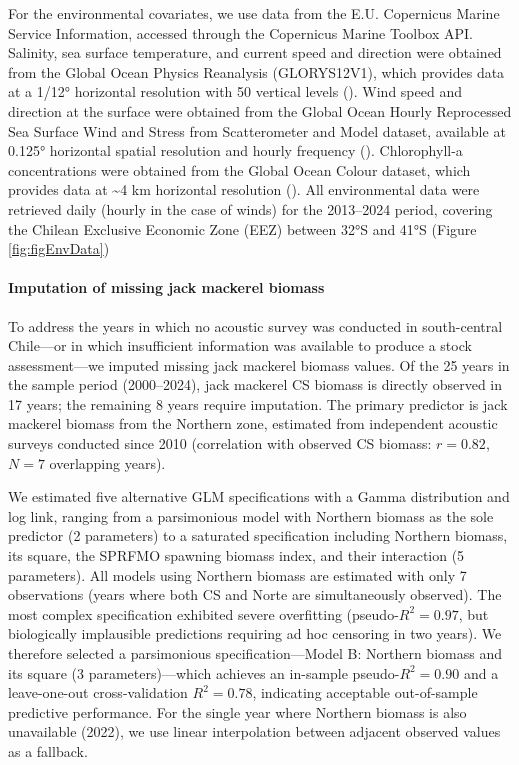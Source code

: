 \documentclass[
  11pt,
]{article}
\begin{document}
For the environmental covariates, we use data from the E.U. Copernicus Marine Service Information, accessed through the Copernicus Marine Toolbox API. Salinity, sea surface temperature, and current speed and direction were obtained from the Global Ocean Physics Reanalysis (GLORYS12V1), which provides data at a 1/12° horizontal resolution with 50 vertical levels (). Wind speed and direction at the surface were obtained from the Global Ocean Hourly Reprocessed Sea Surface Wind and Stress from Scatterometer and Model dataset, available at 0.125° horizontal spatial resolution and hourly frequency (). Chlorophyll-a concentrations were obtained from the Global Ocean Colour dataset, which provides data at \textasciitilde4 km horizontal resolution (). All environmental data were retrieved daily (hourly in the case of winds) for the 2013--2024 period, covering the Chilean Exclusive Economic Zone (EEZ) between 32°S and 41°S (Figure \ref{fig:figEnvData})

\paragraph*{Imputation of missing jack mackerel biomass}\label{imputation-of-missing-jack-mackerel-biomass}

To address the years in which no acoustic survey was conducted in south-central Chile---or in which insufficient information was available to produce a stock assessment---we imputed missing jack mackerel biomass values. Of the 25 years in the sample period (2000--2024), jack mackerel CS biomass is directly observed in 17 years; the remaining 8 years require imputation. The primary predictor is jack mackerel biomass from the Northern zone, estimated from independent acoustic surveys conducted since 2010 (correlation with observed CS biomass: \(r = 0.82\), \(N = 7\) overlapping years).

We estimated five alternative GLM specifications with a Gamma distribution and log link, ranging from a parsimonious model with Northern biomass as the sole predictor (2 parameters) to a saturated specification including Northern biomass, its square, the SPRFMO spawning biomass index, and their interaction (5 parameters). All models using Northern biomass are estimated with only 7 observations (years where both CS and Norte are simultaneously observed). The most complex specification exhibited severe overfitting (pseudo-\(R^2 = 0.97\), but biologically implausible predictions requiring ad hoc censoring in two years). We therefore selected a parsimonious specification---Model B: Northern biomass and its square (3 parameters)---which achieves an in-sample pseudo-\(R^2 = 0.90\) and a leave-one-out cross-validation \(R^2 = 0.78\), indicating acceptable out-of-sample predictive performance. For the single year where Northern biomass is also unavailable (2022), we use linear interpolation between adjacent observed values as a fallback.
\end{document}
